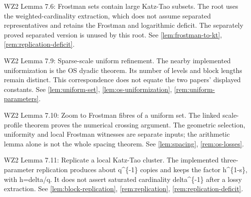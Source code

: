 \begin{remark}
\label{rem:atlas-W2L7_6}
WZ2 Lemma 7.6: Frostman sets contain large Katz-Tao subsets.
The root uses the weighted-cardinality extraction, which does not assume separated representatives and retains the Frostman and logarithmic deficit. The separately proved separated version is unused by this root.
See \ref{lem:frostman-to-kt}, \ref{rem:replication-deficit}.
\end{remark}

\begin{remark}
\label{rem:atlas-W2L7_9}
WZ2 Lemma 7.9: Sparse-scale uniform refinement.
The nearby implemented uniformization is the OS dyadic theorem. Its number of levels and block lengths remain distinct. This correspondence does not equate the two papers' displayed constants.
See \ref{lem:uniform-set}, \ref{lem:os-uniformization}, \ref{rem:uniform-parameters}.
\end{remark}

\begin{remark}
\label{rem:atlas-W2L7_10}
WZ2 Lemma 7.10: Zoom to Frostman fibres of a uniform set.
The linked scale-profile theorem proves the numerical crossing argument. The geometric selection, uniformity and local Frostman witnesses are separate inputs; the arithmetic lemma alone is not the whole spacing theorem.
See \ref{lem:spacing}, \ref{rem:os-losses}.
\end{remark}

\begin{remark}
\label{rem:atlas-W2L7_11}
WZ2 Lemma 7.11: Replicate a local Katz-Tao cluster.
The implemented three-parameter replication produces about q\textasciicircum{}\{-1\} copies and keeps the factor h\textasciicircum{}\{1-s\}, with h=delta/q. It does not assert saturated cardinality delta\textasciicircum{}\{-1\} after a lossy extraction.
See \ref{lem:block-replication}, \ref{rem:replication}, \ref{rem:replication-deficit}.
\end{remark}

